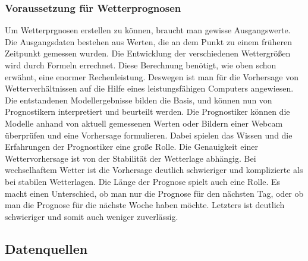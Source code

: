 \subsubsection{Voraussetzung für Wetterprognosen} %
Um Wetterprgnosen erstellen zu können, braucht man gewisse Ausgangswerte.
Die Ausgangsdaten bestehen aus Werten,
die an dem Punkt zu einem früheren Zeitpunkt gemessen wurden.
Die Entwicklung der verschiedenen Wettergrößen wird durch Formeln errechnet.
Diese Berechnung benötigt, wie oben schon erwähnt, eine enormer Rechenleistung.
Deswegen ist man für die Vorhersage von Wetterverhältnissen auf
die Hilfe eines leistungsfähigen Computers angewiesen.
Die entstandenen Modellergebnisse bilden die Basis, und können nun
von Prognostikern interpretiert und beurteilt werden.
Die Prognostiker können die Modelle anhand von aktuell gemessenen Werten
oder Bildern einer Webcam überprüfen und eine Vorhersage formulieren.
Dabei spielen das Wissen und die Erfahrungen der Prognostiker eine große Rolle.
Die Genauigkeit einer Wettervorhersage ist von der Stabilität der Wetterlage abhängig.
Bei wechselhaftem Wetter ist die Vorhersage deutlich schwieriger
und komplizierte als bei stabilen Wetterlagen.
Die Länge der Prognose spielt auch eine Rolle.
Es macht einen Unterschied,
ob man nur die Prognose für den nächsten Tag,
oder ob man die Prognose für die nächste Woche haben möchte.
Letzters ist deutlich schwieriger und somit auch weniger zuverlässig.

\subsection{Datenquellen} %


